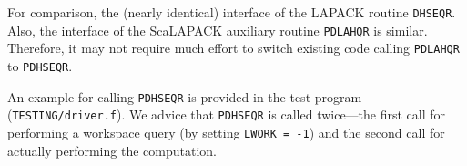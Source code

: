 \documentclass{article}
\begin{document}
\noindent For comparison, the (nearly identical) interface of the LAPACK routine \texttt{DHSEQR}.\\
\medskip
\noindent
\fbox{\usebox{\verbboxdhseqr}}
\medskip
Also, the interface of the ScaLAPACK auxiliary routine
\texttt{PDLAHQR} is similar.\\
\medskip
\noindent
\fbox{\usebox{\verbboxpdlahqr}}
\medskip
%\end{figure*}
Therefore, it may not require much effort to switch existing code calling \texttt{PDLAHQR} to
\texttt{PDHSEQR}.

An example for calling \texttt{PDHSEQR} is provided in the test program
(\texttt{TESTING/driver.f}).
We advice that \texttt{PDHSEQR} is called twice---the first call for
performing a workspace query (by setting \texttt{LWORK = -1}) and the second
call for actually performing the computation.
\end{document}
